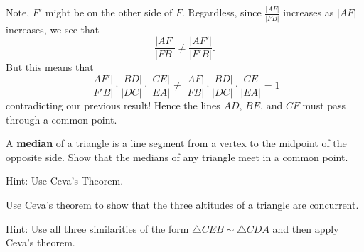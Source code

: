 \documentclass{ximera}
\begin{document}
\begin{question}
\begin{solution}
\begin{freeResponse}
Note, $F'$ might be on the other side of $F$. Regardless, since
$\frac{|AF|}{|FB|}$ increases as $|AF|$ increases, we see that
\[
\frac{|AF|}{|FB|} \ne \frac{|AF'|}{|F'B|}.
\]
But this means that 
\[
\frac{|AF'|}{|F'B|}\cdot\frac{|BD|}{|DC|}\cdot\frac{|CE|}{|EA|}\ne\frac{|AF|}{|FB|}\cdot\frac{|BD|}{|DC|}\cdot\frac{|CE|}{|EA|}=1
\]
contradicting our previous result! Hence the lines $AD$, $BE$, and $CF$ must
pass through a common point.
\end{freeResponse}
\end{solution}
\end{question}

\begin{question}
A \textbf{median} of a triangle is a line segment from a vertex
to the midpoint of the opposite side. Show that the medians of any triangle
meet in a common point.

Hint: Use Ceva's Theorem.
\end{question}

\begin{question}
Use Ceva's theorem to show that the three altitudes of a
triangle are concurrent.
\begin{image}
\end{image}
Hint: Use all three similarities of the form $\triangle
CEB\sim\triangle CDA$ and then apply Ceva's theorem.
\end{question}
\end{document}
